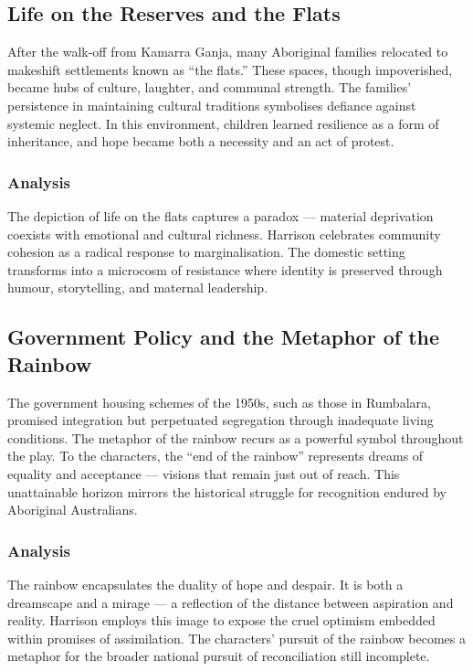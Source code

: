 \documentclass[a4paper]{article}
\begin{document}
\subsection{Life on the Reserves and the Flats}
After the walk-off from Kamarra Ganja, many Aboriginal families relocated to makeshift settlements known as “the flats.” These spaces, though impoverished, became hubs of culture, laughter, and communal strength. The families’ persistence in maintaining cultural traditions symbolises defiance against systemic neglect. In this environment, children learned resilience as a form of inheritance, and hope became both a necessity and an act of protest.\\

\subsubsection{Analysis}
The depiction of life on the flats captures a paradox — material deprivation coexists with emotional and cultural richness. Harrison celebrates community cohesion as a radical response to marginalisation. The domestic setting transforms into a microcosm of resistance where identity is preserved through humour, storytelling, and maternal leadership.\\

\subsection{Government Policy and the Metaphor of the Rainbow}
The government housing schemes of the 1950s, such as those in Rumbalara, promised integration but perpetuated segregation through inadequate living conditions. The metaphor of the rainbow recurs as a powerful symbol throughout the play. To the characters, the “end of the rainbow” represents dreams of equality and acceptance — visions that remain just out of reach. This unattainable horizon mirrors the historical struggle for recognition endured by Aboriginal Australians.\\

\subsubsection{Analysis}
The rainbow encapsulates the duality of hope and despair. It is both a dreamscape and a mirage — a reflection of the distance between aspiration and reality. Harrison employs this image to expose the cruel optimism embedded within promises of assimilation. The characters’ pursuit of the rainbow becomes a metaphor for the broader national pursuit of reconciliation still incomplete.\\
\end{document}
